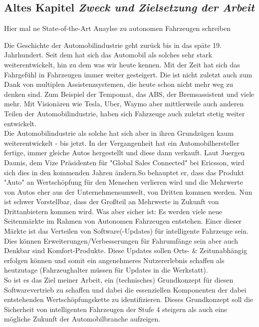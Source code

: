 \subsection{Altes Kapitel \textit{Zweck und Zielsetzung der Arbeit}}

Hier mal ne State-of-the-Art Anaylse zu autonomen Fahrzeugen schreiben

Die Geschichte der Automobilindustrie geht zurück bis in das späte 19. Jahrhundert. Seit dem hat sich das Automobil als solches sehr stark weiterentwickelt, hin zu dem was wir heute kennen. Mit der Zeit hat sich das Fahrgefühl in Fahrzeugen immer weiter gesteigert. Die ist nicht zuletzt auch zum Dank von multiplen Assistenzsystemen, die heute schon nicht mehr weg zu denken sind. Zum Beispiel der Tempomat, das ABS, der Bremsassistent und viele mehr. Mit Visionären wie Tesla, Uber, Waymo aber mittlerweile auch anderen Teilen der Automobilindustrie, haben sich Fahrzeuge auch zuletzt stetig weiter entwickelt. \\ 
Die Automobilindustrie als solche hat sich aber in ihren Grundzügen kaum weiterentwickelt - bis jetzt. In der Vergangenheit hat ein Automobilhersteller fertige, immer gleiche Autos hergestellt und diese dann verkauft. Laut Juergen Daunis, dem Vize Präsidenten für "Global Sales Connected" bei Ericsson, wird sich dies in den kommenden Jahren ändern.So behauptet er, dass das Produkt "Auto" an Wertschöpfung für den Menschen verlieren wird und die Mehrwerte von Autos eher aus der Unternehmensumwelt, von Dritten kommen werden.\cite{b1} Nun ist schwer Vorstellbar, dass der Großteil an Mehrwerte in Zukunft von Drittanbietern kommen wird. Was aber sicher ist: Es werden viele neue Seitenmärkte im Rahmen von Autonomen Fahrzeugen entstehen. Einer dieser Märkte ist das Verteilen von Software(-Updates) für intelligente Fahrzeuge sein. Dies können Erweiterungen/Verbesserungen für Fahrumfänge sein aber auch Denkbar sind Komfort-Produkte. Diese Updates sollen Orts- \& Zeitunabhängig erfolgen können und somit ein angenehmeres Nutzererlebnis schaffen als heutzutage (Fahrzeughalter müssen für Updates in die Werkstatt).\\
So ist es das Ziel meiner Arbeit, ein (technisches) Grundkonzept für diesen Softwarevertrieb zu schaffen und dabei die essenziellen Komponenten der dabei entstehenden Wertschöpfungskette zu identifizieren. Dieses Grundkonzept soll die Sicherheit von intelligenten Fahrzeugen der Stufe 4 steigern als auch eine mögliche Zukunft der Automobilbranche aufzeigen.\\
